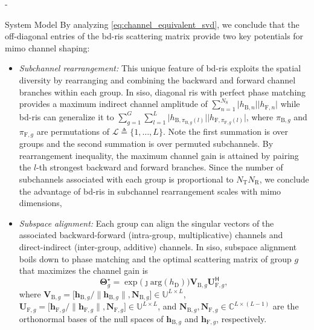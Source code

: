 \begin{section}{-}
\begin{subsection}{System Model}
		By analyzing \eqref{eq:channel_equivalent_svd}, we conclude that the off-diagonal entries of the \gls{bd}-\gls{ris} scattering matrix provide two key potentials for \gls{mimo} channel shaping:
		\begin{itemize}
			\item \emph{Subchannel rearrangement:} This unique feature of \gls{bd}-\gls{ris} exploits the spatial diversity by rearranging and combining the backward and forward channel branches within each group. In \gls{siso}, diagonal \gls{ris} with perfect phase matching provides a maximum indirect channel amplitude of $\sum_{n=1}^{N_\mathrm{S}} \lvert h_{\mathrm{B},n} \rvert \lvert h_{\mathrm{F},n} \rvert$ while \gls{bd}-\gls{ris} can generalize it to $\sum_{g=1}^{G} \sum_{l=1}^{L} \lvert h_{\mathrm{B},\pi_{\mathrm{B},g}(l)} \rvert \lvert h_{\mathrm{F},\pi_{\mathrm{F},g}(l)} \rvert$, where $\pi_{\mathrm{B},g}$ and $\pi_{\mathrm{F},g}$ are permutations of $\mathcal{L} \triangleq \{1, \ldots, L\}$.
			Note the first summation is over groups and the second summation is over permuted subchannels.
			By rearrangement inequality, the maximum channel gain is attained by pairing the $l$-th strongest backward and forward branches.
			Since the number of subchannels associated with each group is proportional to $N_\mathrm{T} N_\mathrm{R}$, we conclude the advantage of \gls{bd}-\gls{ris} in subchannel rearrangement scales with \gls{mimo} dimensions,
			\item \emph{Subspace alignment:} Each group can align the singular vectors of the associated backward-forward (intra-group, multiplicative) channels and direct-indirect (inter-group, additive) channels. In \gls{siso}, subspace alignment boils down to phase matching and the optimal scattering matrix of group $g$ that maximizes the channel gain is
			\begin{equation}
				\mathbf{\Theta}_g^\star = \exp \bigl(\jmath \mathrm{arg}(h_\mathrm{D})\bigr) \mathbf{V}_{\mathrm{B},g} \mathbf{U}_{\mathrm{F},g}^\mathsf{H},
				\label{eq:scattering_siso}
			\end{equation}
			where $\mathbf{V}_{\mathrm{B},g} = \bigl[\mathbf{h}_{\mathrm{B},g}/\lVert \mathbf{h}_{\mathrm{B},g} \rVert, \mathbf{N}_{\mathrm{B},g}\bigr] \in \mathbb{U}^{L \times L}$, $\mathbf{U}_{\mathrm{F},g} = \bigl[\mathbf{h}_{\mathrm{F},g}/\lVert \mathbf{h}_{\mathrm{F},g} \rVert, \mathbf{N}_{\mathrm{F},g}\bigr] \in \mathbb{U}^{L \times L}$, and $\mathbf{N}_{\mathrm{B},g}, \mathbf{N}_{\mathrm{F},g} \in \mathbb{C}^{L \times (L-1)}$ are the orthonormal bases of the null spaces of $\mathbf{h}_{\mathrm{B},g}$ and $\mathbf{h}_{\mathrm{F},g}$, respectively.

\end{itemize}
\end{subsection}
\end{section}
